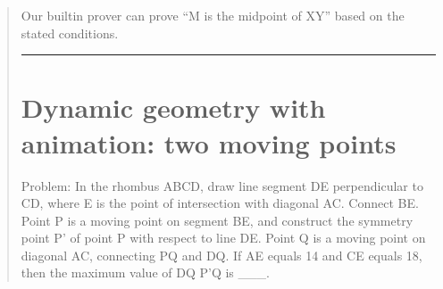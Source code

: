 \documentclass[letterpaper,10pt,english]{sphinxmanual}
\begin{document}
\begin{quote}
\begin{sphinxVerbatim}[commandchars=\\\{\}]
 
     

\end{sphinxVerbatim}

\sphinxAtStartPar
{}

\sphinxAtStartPar
Our built\sphinxhyphen{}in prover can prove “M is the midpoint of XY” based on the stated conditions.

\begin{sphinxVerbatim}[commandchars=\\\{\}]


\end{sphinxVerbatim}


\bigskip\hrule\bigskip



\section{Dynamic geometry with animation: two moving points}
\label{\detokenize{examples:dynamic-geometry-with-animation-two-moving-points}}
\sphinxAtStartPar
Problem: In the rhombus ABCD, draw line segment DE perpendicular to CD, where E is the point of intersection with diagonal AC. Connect BE. Point P is a moving point on segment BE, and construct the symmetry point P’ of point P with respect to line DE. Point Q is a moving point on diagonal AC, connecting PQ and DQ. If AE equals 14 and CE equals 18, then the maximum value of DQ \sphinxhyphen{} P’Q is \_\_\_.


\end{quote}
\end{document}
